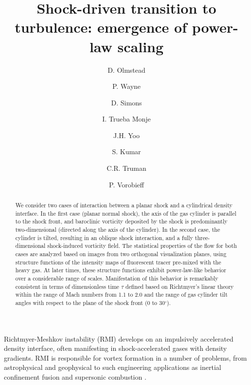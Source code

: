 \documentclass[preprint,superscriptaddress,showpacs]{revtex4-1}
\begin{document}
\title{Shock-driven transition to turbulence: emergence of power-law scaling}

\author{D. Olmstead}
\author{P. Wayne}
\author{D. Simons}
\author{I. Trueba Monje}
\author{J.H. Yoo}
\author{S. Kumar}
\author{C.R. Truman}
\author{P. Vorobieff}


\begin{abstract}
We consider two cases of interaction between a planar shock and a cylindrical density interface.
In the first case (planar normal shock), the axis of the gas cylinder is parallel to the shock
front, and baroclinic vorticity deposited by the shock is predominantly two-dimensional 
(directed along the axis of the cylinder). In the second case, the cylinder is tilted, resulting in 
an oblique shock interaction, and a fully three-dimensional shock-induced vorticity field. 
The statistical properties of the flow 
for both cases are analyzed based on images from two orthogonal visualization planes, using structure functions of the intensity maps of fluorescent tracer pre-mixed with the heavy gas. 
At later times, these structure functions exhibit power-law-like behavior over a considerable range 
of scales. Manifestation of this behavior is remarkably consistent in terms of dimensionless 
time $\tau$ defined based on Richtmyer's linear theory within the range of Mach numbers 
from 1.1 to 2.0 and the range of gas cylinder tilt angles with respect to the plane of the shock 
front (0 to 30$^\circ$).
\end{abstract}


\maketitle

Richtmyer-Meshkov instability (RMI) \cite{richtmyer,meshkov} develops on an impulsively accelerated density 
interface, often manifesting in shock-accelerated gases with density gradients. RMI is 
responsible for vortex formation in a number of problems, from astrophysical \cite{rmi-supernova} and geophysical 
\cite{rmi-geophys} to such engineering applications as inertial confinement fusion \cite{rmi-icf} 
and supersonic combustion \cite{yang}. 
\end{document}
